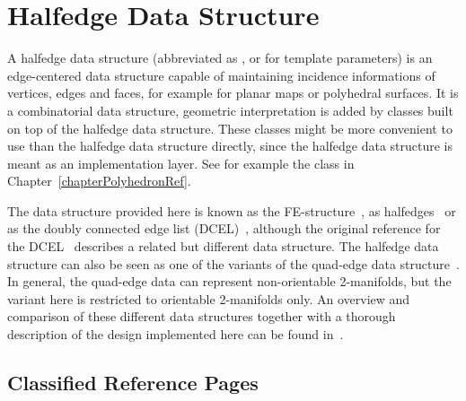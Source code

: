
\chapter{Halfedge Data Structure}
\label{chapterHalfedgeDSRef}


A halfedge data structure (abbreviated as , or
 for template parameters) is an edge-centered data structure
capable of maintaining incidence informations of vertices, edges and
faces, for example for planar maps or polyhedral surfaces. It is a
combinatorial data structure, geometric interpretation is added by
classes built on top of the halfedge data structure.  These classes
might be more convenient to use than the halfedge data structure
directly, since the halfedge data structure is meant as an
implementation layer.  See for example the 
class in Chapter~\ref{chapterPolyhedronRef}.

The data structure provided here is known as the
FE-structure~\cite{w-ebdss-85}, as
halfedges~\cite{m-ism-88,cgal:bfh-mgedm-95} or as the doubly connected edge
list (DCEL)~\cite{bkos-cgaa-97}, although the original reference for
the DCEL~\cite{mp-fitcp-78} describes a related but different data
structure. The halfedge data structure can also be seen as one of the
variants of the quad-edge data structure~\cite{gs-pmgsc-85}. In
general, the quad-edge data can represent non-orientable 2-manifolds,
but the variant here is restricted to orientable 2-manifolds only. An
overview and comparison of these different data structures together
with a thorough description of the design implemented here can be
found in~\cite{k-ugpdd-99}.


\section{Classified Reference Pages}

